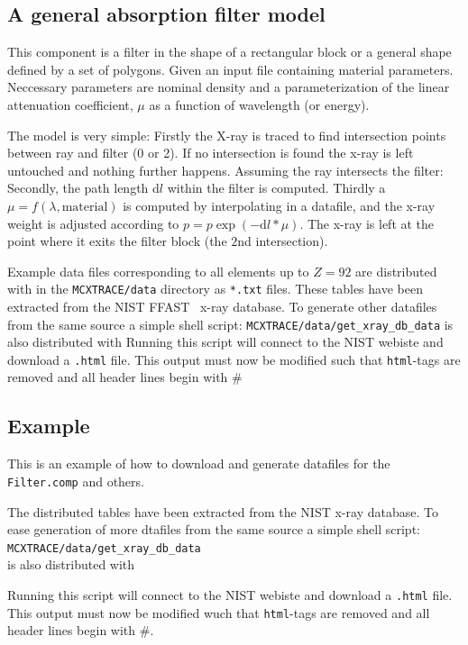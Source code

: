 \subsection*{A general absorption filter model}
\label{s:filter}
This component is a filter in the shape of a rectangular block or a general
shape defined by a set of polygons. Given an input file containing material
parameters. Neccessary parameters are nominal density and a parameterization of
the linear attenuation coefficient, $\mu$ as a function of wavelength (or
energy).

The model is very simple: Firstly the X-ray is traced to find intersection points between ray and filter (0 or 2).
If no intersection is found the x-ray is left untouched and nothing further happens.
Assuming the ray intersects the filter: Secondly, the path length d$l$ within the filter is computed.
Thirdly a $\mu = f(\lambda,\mathrm{material})$ is computed by interpolating in
a datafile, and the x-ray weight is adjusted according to
$p=p\exp(-\mathrm{d}l*\mu)$. The x-ray is left at the point where it exits the
filter block (the $2$nd intersection).

Example data files corresponding to all elements up to $Z=92$ are distributed with \MCX in the
\verb+MCXTRACE/data+ directory as \verb+*.txt+ files. These tables have been
extracted from the NIST FFAST~\cite{NIST-ffast} x-ray database.
To generate other datafiles from the same source a simple shell script:
\verb+MCXTRACE/data/get_xray_db_data+ is also distributed with \MCX
Running this script will connect to the NIST webiste and download a
\verb+.html+ file. This output must now be modified such that \verb+html+-tags
are removed and all header lines begin with $\#$

\subsection{Example}
\label{getNISTdata}
This is an example of how to download and generate datafiles for the \verb+Filter.comp+ and others.

The distributed tables have been extracted from the NIST x-ray database. To ease generation of more dtafiles
from the same source a simple shell script:\\
\verb+MCXTRACE/data/get_xray_db_data+\\
is also distributed with \MCX

Running this script will connect to the NIST webiste and download a \verb+.html+ file. This output must now be modified wuch that \verb+html+-tags
are removed and all header lines begin with $\#$.

